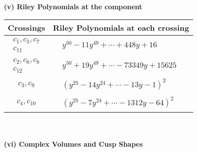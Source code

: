 \documentclass[1p]{elsarticle_modified}
\theoremstyle{definition}
\begin{document}
\newpage\renewcommand{\arraystretch}{1}
\flushleft \textbf{(v) Riley Polynomials at the component}\newline \\
\begin{tabular}{m{50pt}|m{274pt}}
Crossings & \hspace{64pt}Riley Polynomials at each crossing \\
\hline $$\begin{aligned}c_{1},c_{5},c_{7}\\c_{11}\end{aligned}$$&$\begin{aligned}
&y^{50}-11 y^{49}+\cdots+448 y+16
\end{aligned}$\\
\hline $$\begin{aligned}c_{2},c_{6},c_{8}\\c_{12}\end{aligned}$$&$\begin{aligned}
&y^{50}+19 y^{49}+\cdots-73349 y+15625
\end{aligned}$\\
\hline $$\begin{aligned}c_{3},c_{9}\end{aligned}$$&$\begin{aligned}
&(y^{25}-14 y^{24}+\cdots-13 y-1)^{2}
\end{aligned}$\\
\hline $$\begin{aligned}c_{4},c_{10}\end{aligned}$$&$\begin{aligned}
&(y^{25}-7 y^{24}+\cdots-1312 y-64)^{2}
\end{aligned}$\\
\hline
\end{tabular}\\~\\
\newpage\flushleft \textbf{(vi) Complex Volumes and Cusp Shapes}
\end{document}
